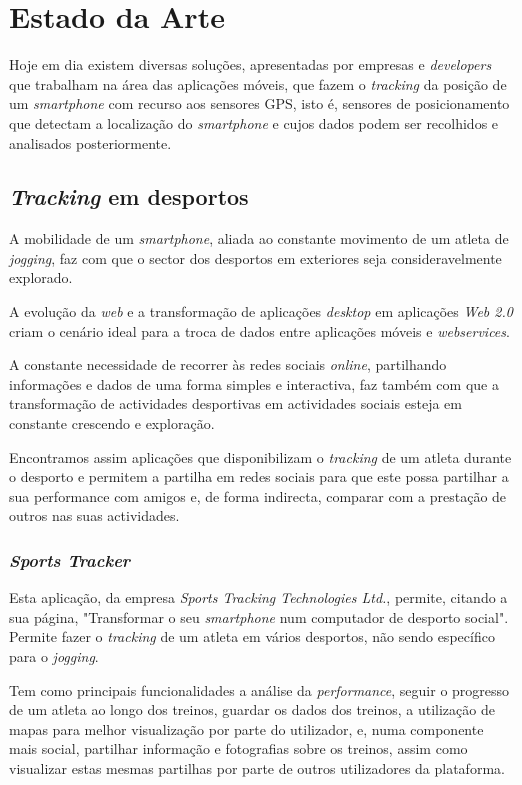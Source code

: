 \documentclass[twocolumn,twoside,10pt,a4paper]{article}
\begin{document}
\section{Estado da Arte}\label{sec:estarte}

Hoje em dia existem diversas soluções, apresentadas por empresas e \emph{developers} que trabalham na área das aplicações móveis, que fazem o \textit{tracking} da posição de um \emph{smartphone} com recurso aos sensores GPS, isto é, sensores de posicionamento que detectam a localização do \emph{smartphone} e cujos dados podem ser recolhidos e analisados posteriormente.

\subsection{\emph{Tracking} em desportos}

A mobilidade de um \emph{smartphone}, aliada ao constante movimento de um atleta de \emph{jogging}, faz com que o sector dos desportos em exteriores seja consideravelmente explorado.

A evolução da \emph{web} e a transformação de aplicações \emph{desktop} em aplicações \emph{Web 2.0} criam o cenário ideal para a troca de dados entre aplicações móveis e \emph{webservices}.

A constante necessidade de recorrer às redes sociais \emph{online}, partilhando informações e dados de uma forma simples e interactiva, faz também com que a transformação de actividades desportivas em actividades sociais esteja em constante crescendo e exploração.
 
Encontramos assim aplicações que disponibilizam o \emph{tracking} de um atleta durante o desporto e permitem a partilha em redes sociais para que este possa partilhar a sua performance com amigos e, de forma indirecta, comparar com a prestação de outros nas suas actividades.

\subsubsection{\emph{Sports Tracker}}

Esta aplicação, da empresa \textit{Sports Tracking Technologies Ltd.}, permite, citando a sua página, "Transformar o seu \textit{smartphone} num computador de desporto social". Permite fazer o \textit{tracking} de um atleta em vários desportos, não sendo específico para o \textit{jogging}. 

Tem como principais funcionalidades a análise da \textit{performance}, seguir o progresso de um atleta ao longo dos treinos, guardar os dados dos treinos, a utilização de mapas para melhor visualização por parte do utilizador,  e, numa componente mais social, partilhar informação e fotografias sobre os treinos, assim como visualizar estas mesmas partilhas por parte de outros utilizadores da plataforma.
\end{document}

